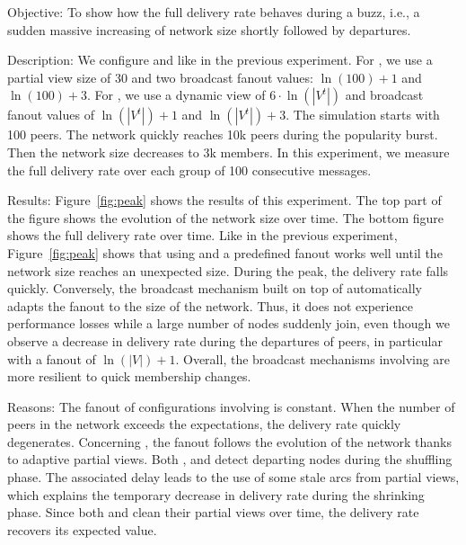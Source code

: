 \begin{asparadesc}
\item [Objective:] To show how the full delivery rate behaves during a buzz,
  i.e., a sudden massive increasing of network size shortly followed by
  departures.
\item [Description:] We configure \SPRAY and \CYCLON like in the
  previous experiment. For \CYCLON, we use a partial view size of 30
  and two broadcast fanout values: $\ln(100)+1$ and $\ln(100)+3$. For
  \SPRAY, we use a dynamic view of $6 \cdot \ln(|V^t|)$ and broadcast
  fanout values of $\ln(|V^t|)+1$ and $\ln(|V^t|)+3$. The simulation
  starts with 100 peers. The network quickly reaches 10k peers during
  the popularity burst. Then the network size decreases to 3k
  members. In this experiment, we measure the full delivery rate over
  each group of 100 consecutive messages.
\item [Results:] Figure~\ref{fig:peak} shows the results of this
  experiment. The top part of the figure shows the evolution of the
  network size over time. The bottom figure shows the full delivery
  rate over time. Like in the previous experiment,
  Figure~\ref{fig:peak} shows that using \CYCLON and a predefined
  fanout works well until the network size reaches an unexpected
  size. During the peak, the delivery rate falls quickly. Conversely,
  the broadcast mechanism built on top of \SPRAY automatically adapts
  the fanout to the size of the network. Thus, it does not experience
  performance losses while a large number of nodes suddenly join, even
  though we observe a decrease in delivery rate during the departures
  of peers, in particular with a fanout of $\ln(|V|)+1$. Overall, the
  broadcast mechanisms involving \SPRAY are more resilient to quick
  membership changes.
\item [Reasons:] The fanout of configurations involving \CYCLON is
  constant. When the number of peers in the network exceeds the
  expectations, the delivery rate quickly degenerates. Concerning
  \SPRAY, the fanout follows the evolution of the network thanks to
  adaptive partial views. Both \SPRAY, and \CYCLON detect departing
  nodes during the shuffling phase. The associated delay leads to the
  use of some stale arcs from partial views, which explains the
  temporary decrease in delivery rate during the shrinking
  phase. Since both \CYCLON and \SPRAY clean their partial views over
  time, the delivery rate recovers its expected value.
\end{asparadesc}


